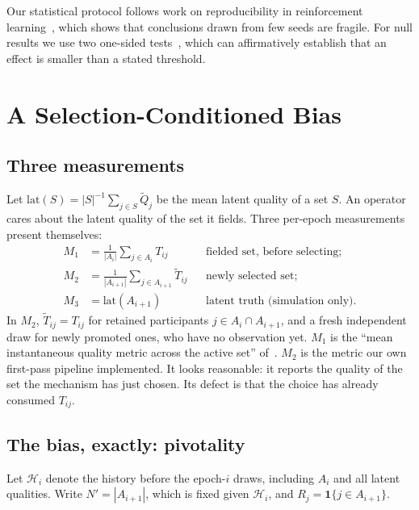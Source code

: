 \documentclass[sigconf,anonymous,review,nonacm]{acmart}
\begin{document}
Our statistical protocol follows work on reproducibility in reinforcement
learning~\cite{henderson2018deep,agarwal2021precipice}, which shows that conclusions drawn
from few seeds are fragile. For null results we use two one-sided
tests~\cite{schuirmann1987tost,lakens2017equivalence}, which can affirmatively establish
that an effect is smaller than a stated threshold.

\section{A Selection-Conditioned Bias}
\label{sec:bias}

\subsection{Three measurements}
Let $\mathrm{lat}(S)=|S|^{-1}\sum_{j\in S}\tilde Q_j$ be the mean latent quality of a set
$S$. An operator cares about the latent quality of the set it fields. Three per-epoch
measurements present themselves:
\begin{align}
M_1 &= \tfrac{1}{|A_i|}\textstyle\sum_{j\in A_i} T_{ij}
  && \text{fielded set, before selecting;}\\
M_2 &= \tfrac{1}{|A_{i+1}|}\textstyle\sum_{j\in A_{i+1}} \tilde T_{ij}
  && \text{newly selected set;}\\
M_3 &= \mathrm{lat}(A_{i+1})
  && \text{latent truth (simulation only).}
\end{align}
In $M_2$, $\tilde T_{ij}=T_{ij}$ for retained participants $j\in A_i\cap A_{i+1}$, and a
fresh independent draw for newly promoted ones, who have no observation yet. $M_1$ is the
``mean instantaneous quality metric across the active set'' of~\cite{kruijssen2024}. $M_2$
is the metric our own first-pass pipeline implemented. It looks reasonable: it reports the
quality of the set the mechanism has just chosen. Its defect is that the choice has
already consumed $T_{ij}$.

\subsection{The bias, exactly: pivotality}
Let $\mathcal H_i$ denote the history before the epoch-$i$ draws, including $A_i$ and all
latent qualities. Write $N'=|A_{i+1}|$, which is fixed given $\mathcal H_i$, and
$R_j=\mathbf 1\{j\in A_{i+1}\}$.
\end{document}
